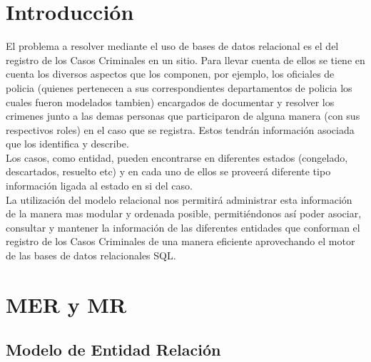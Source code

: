 \documentclass[10pt,a4paper]{article}
\begin{document}

\fecha{\today}


\maketitle

\tableofcontents
\newpage

\section{Introducción}
El problema a resolver mediante el uso de bases de datos relacional es el del registro de los Casos Criminales en un sitio. Para llevar cuenta de ellos se tiene en cuenta los diversos aspectos que los componen, por ejemplo, los oficiales de policia (quienes pertenecen a sus correspondientes departamentos de policia los cuales fueron modelados tambien) encargados de documentar y resolver los crimenes junto a las demas personas que participaron de alguna manera (con sus respectivos roles) en el caso que se registra. Estos tendrán información asociada que los identifica y describe. \\
Los casos, como entidad, pueden encontrarse en diferentes estados (congelado, descartados, resuelto etc) y en cada uno de ellos se proveerá diferente tipo información ligada al estado en si del caso. \\
La utilización del modelo relacional nos permitirá  administrar esta información de la manera mas modular y ordenada posible, permitiéndonos así poder asociar, consultar y mantener la información de las diferentes entidades que conforman el registro de los Casos Criminales de una manera eficiente aprovechando el motor de las bases de datos relacionales SQL.
\section{MER y MR}

\subsection{Modelo de Entidad Relación}
\end{document}
